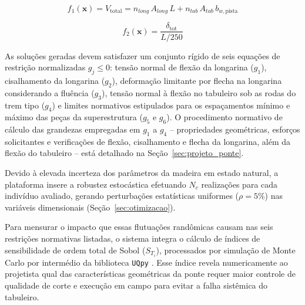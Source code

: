 \begin{equation}
f_1(\mathbf{x}) = V_{\mathrm{total}} = n_{long}\,A_{long}\,L + n_{tab}\,A_{tab}\,b_{w,\mathrm{pista}}
\label{eq:f1}
\end{equation}

\begin{equation}
f_2(\mathbf{x}) = \frac{\delta_{\mathrm{tot}}}{L/250}
\label{eq:f2}
\end{equation}

As soluções geradas devem satisfazer um conjunto rígido de seis equações de restrição normalizadas $g_j \leq 0$: tensão normal de flexão da longarina ($g_1$), cisalhamento da longarina ($g_2$), deformação limitante por flecha na longarina considerando a fluência ($g_3$), tensão normal à flexão no tabuleiro sob as rodas do trem tipo ($g_4$) e limites normativos estipulados para os espaçamentos mínimo e máximo das peças da superestrutura ($g_5$ e $g_6$).
O procedimento normativo de cálculo das grandezas empregadas em $g_1$ a $g_4$ -- propriedades geométricas, esforços solicitantes e verificações de flexão, cisalhamento e flecha da longarina, além da flexão do tabuleiro -- está detalhado na Seção~\ref{sec:projeto_ponte}.

Devido à elevada incerteza dos parâmetros da madeira em estado natural, a plataforma insere a robustez estocástica efetuando $N_c$ realizações para cada indivíduo avaliado, gerando perturbações estatísticas uniformes ($\rho = 5\%$) nas variáveis dimensionais (Seção~\ref{sec:otimizacao}).

Para mensurar o impacto que essas flutuações randômicas causam nas seis restrições normativas listadas, o sistema integra o cálculo de índices de sensibilidade de ordem total de Sobol ($S_{T_i}$), processados por simulação de Monte Carlo por intermédio da biblioteca \texttt{UQpy} \parencite{Olivier2020}.
Esse índice revela numericamente ao projetista qual das características geométricas da ponte requer maior controle de qualidade de corte e execução em campo para evitar a falha sistêmica do tabuleiro.

